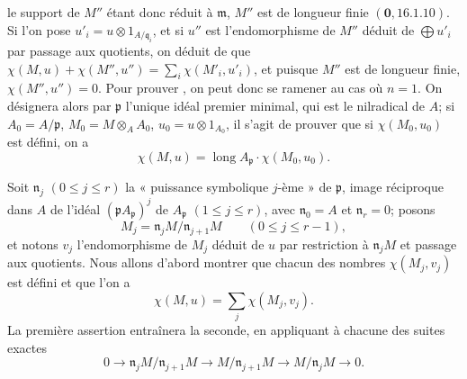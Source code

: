 le support de $M''$ étant donc réduit à $\mathfrak{m}$, $M''$ est de longueur finie $(\mathbf{0},16.1.10)$.
Si l'on pose $u'_i=u\otimes1_{A/\mathfrak{q}_i}$, et si $u''$ est l'endomorphisme de $M''$ déduit de $\bigoplus u'_i$ par passage aux quotients, on déduit de  que $\chi(M,u)+\chi(M'',u'')=\sum_i\chi(M'_i,u'_i)$, et puisque $M''$ est de longueur finie, $\chi(M'',u'')=0$.
Pour prouver , on peut donc se ramener au cas où $n=1$.
On désignera alors par $\mathfrak{p}$ l'unique idéal premier minimal, qui est le nilradical de $A$;
si $A_0=A/\mathfrak{p}$, $M_0=M\otimes_AA_0$, $u_0=u\otimes1_{A_0}$, il s'agit de prouver que si $\chi(M_0,u_0)$ est défini, on a
\[
\label{IV.21.10.17.9}
  \chi(M,u)=\operatorname{long}A_{\mathfrak{p}}\cdot\chi(M_0,u_0).
  \tag{21.10.17.9}
\]

Soit $\mathfrak{n}_j$ $(0\leq j\leq r)$ la « puissance symbolique $j$-ème » de $\mathfrak{p}$, image réciproque dans $A$ de l'idéal $(\mathfrak{p}A_{\mathfrak{p}})^j$ de $A_{\mathfrak{p}}$ $(1\leq j\leq r)$, avec $\mathfrak{n}_0=A$ et $\mathfrak{n}_r=0$;
posons
\[
  M_j=\mathfrak{n}_jM/\mathfrak{n}_{j+1}M\qquad(0\leq j\leq r-1),
\]
et notons $v_j$ l'endomorphisme de $M_j$ déduit de $u$ par restriction à $\mathfrak{n}_jM$ et passage aux quotients.
Nous allons d'abord montrer que chacun des nombres $\chi(M_j,v_j)$ est défini et que l'on a
\[
\label{IV.21.10.17.10}
  \chi(M,u)=\sum_j\chi(M_j,v_j).
  \tag{21.10.17.10}
\]
La première assertion entraînera la seconde, en appliquant  à chacune des suites exactes
\[
  0\to\mathfrak{n}_jM/\mathfrak{n}_{j+1}M\to M/\mathfrak{n}_{j+1}M\to M/\mathfrak{n}_jM\to0.
\]

